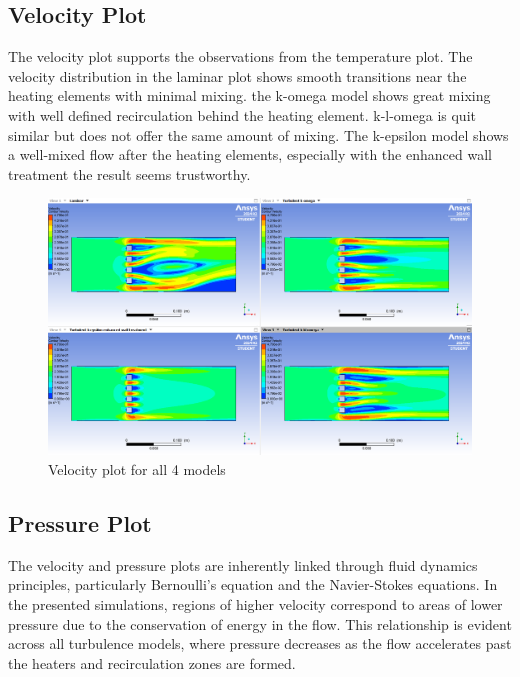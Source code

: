 \subsection{Velocity Plot}

The velocity plot supports the observations from the temperature plot.
The velocity distribution in the laminar plot shows smooth transitions near the heating elements with minimal mixing. the k-omega model shows great mixing with well defined recirculation behind the heating element. k-l-omega is quit similar but does not offer the same amount of mixing.
The k-epsilon model shows a well-mixed flow after the heating elements, especially with the enhanced wall treatment the result seems trustworthy.


\begin{figure}[htbp]   
    \centering
    \includegraphics[width=1\textwidth]{img/Velocity_plot_comparison.png}
    \caption{Velocity plot for all 4 models}
    \label{fig:velocity_plot}
\end{figure}

\subsection{Pressure Plot}

The velocity and pressure plots are inherently linked through fluid dynamics principles, particularly Bernoulli's equation and the Navier-Stokes equations. In the presented simulations, regions of higher velocity correspond to areas of lower pressure due to the conservation of energy in the flow. This relationship is evident across all turbulence models, where pressure decreases as the flow accelerates past the heaters and recirculation zones are formed.

